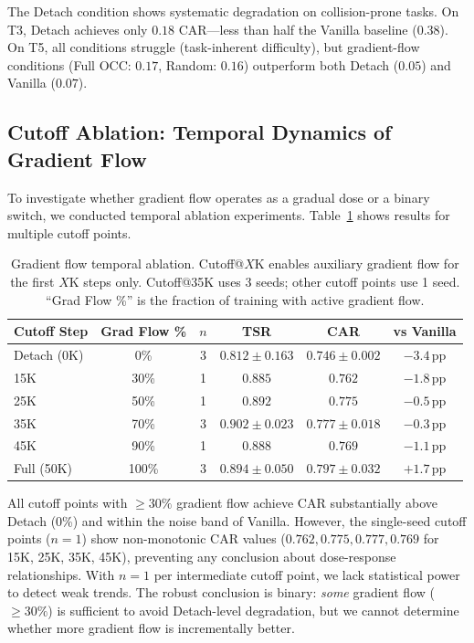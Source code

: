 \documentclass[letterpaper]{article}
\newcommand{\pp}{\,\textrm{pp}}
\begin{document}
The Detach condition shows systematic degradation on collision-prone tasks.
On T3, Detach achieves only $0.18$ CAR---less than half the Vanilla baseline ($0.38$).
On T5, all conditions struggle (task-inherent difficulty), but gradient-flow conditions (Full OCC: $0.17$, Random: $0.16$) outperform both Detach ($0.05$) and Vanilla ($0.07$).

\subsection{Cutoff Ablation: Temporal Dynamics of Gradient Flow}
\label{sec:cutoff}

To investigate whether gradient flow operates as a gradual dose or a binary switch, we conducted temporal ablation experiments.
Table~\ref{tab:cutoff} shows results for multiple cutoff points.

\begin{table}[h]
\centering
\caption{Gradient flow temporal ablation. Cutoff@$X$K enables auxiliary gradient flow for the first $X$K steps only. Cutoff@35K uses 3 seeds; other cutoff points use 1 seed. ``Grad Flow \%'' is the fraction of training with active gradient flow.}
\label{tab:cutoff}
\small
\begin{tabular}{lccccc}
\toprule
\textbf{Cutoff Step} & \textbf{Grad Flow \%} & \textbf{$n$} & \textbf{TSR} & \textbf{CAR} & \textbf{vs Vanilla} \\
\midrule
Detach (0K) & 0\% & 3 & $0.812 \pm 0.163$ & $0.746 \pm 0.002$ & $-3.4\pp$ \\
15K & 30\% & 1 & $0.885$ & $0.762$ & $-1.8\pp$ \\
25K & 50\% & 1 & $0.892$ & $0.775$ & $-0.5\pp$ \\
35K & 70\% & 3 & $0.902 \pm 0.023$ & $0.777 \pm 0.018$ & $-0.3\pp$ \\
45K & 90\% & 1 & $0.888$ & $0.769$ & $-1.1\pp$ \\
Full (50K) & 100\% & 3 & $0.894 \pm 0.050$ & $0.797 \pm 0.032$ & $+1.7\pp$ \\
\bottomrule
\end{tabular}
\end{table}

All cutoff points with $\geq 30\%$ gradient flow achieve CAR substantially above Detach (0\%) and within the noise band of Vanilla.
However, the single-seed cutoff points ($n=1$) show non-monotonic CAR values ($0.762, 0.775, 0.777, 0.769$ for 15K, 25K, 35K, 45K), preventing any conclusion about dose-response relationships.
With $n=1$ per intermediate cutoff point, we lack statistical power to detect weak trends.
The robust conclusion is binary: \emph{some} gradient flow ($\geq 30\%$) is sufficient to avoid Detach-level degradation, but we cannot determine whether more gradient flow is incrementally better.
\end{document}
